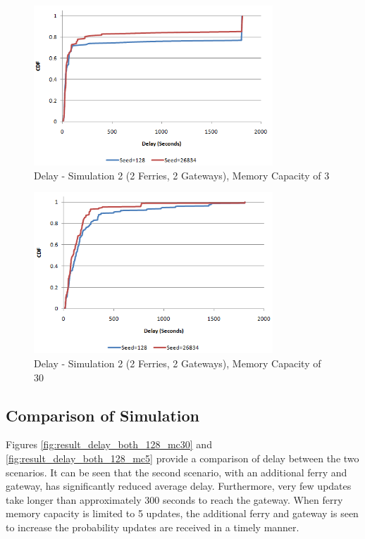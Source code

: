 \begin{figure}[htbp]
    \centering
    \includegraphics[width=0.8\textwidth]{images/result_delay_sim2byseed_mc3.png}
    \caption{Delay - Simulation 2 (2 Ferries, 2 Gateways), Memory Capacity of 3}
    \label{fig:result_delay_sim2byseed_mc3}
\end{figure}


\begin{figure}[htbp]
    \centering
    \includegraphics[width=0.8\textwidth]{images/result_delay_sim2byseed_mc30.png}
    \caption{Delay - Simulation 2 (2 Ferries, 2 Gateways), Memory Capacity of 30}
    \label{fig:result_delay_sim2byseed_mc30}
\end{figure}

\subsection{Comparison of Simulation}

Figures \ref{fig:result_delay_both_128_mc30} and \ref{fig:result_delay_both_128_mc5} provide a comparison of delay between the two scenarios.
It can be seen that the second scenario, with an additional ferry and gateway, has significantly reduced average delay.
Furthermore, very few updates take longer than approximately 300 seconds to reach the gateway.
When ferry memory capacity is limited to 5 updates, the additional ferry and gateway is seen to increase the probability updates are received in a timely manner.

